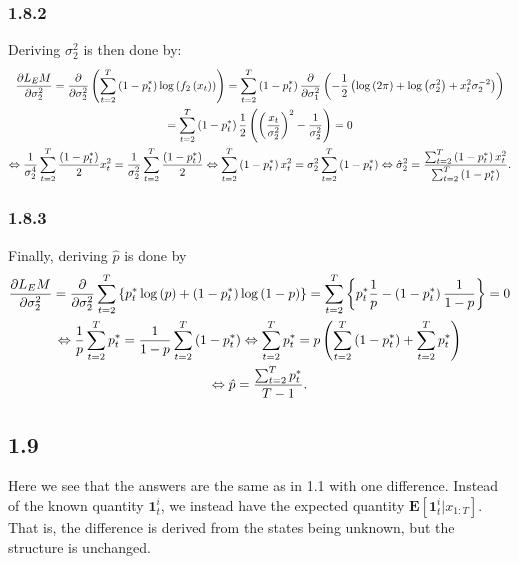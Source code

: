 \documentclass[11pt,a4paper,oneside]{article}
\newcommand{\LL}{\Leftrightarrow}
\newcommand{\lp}{\left(}
\newcommand{\rp}{\right)}
\newcommand{\rb}{\right]}
\newcommand{\lb}{\left[}
\newcommand{\lc}{\left\{}
\newcommand{\rc}{\right\}}
\newcommand{\ee}{\mathbf{E}}
\newcommand{\ii}{\mathbf{1}}
\begin{document}
\subsubsection{1.8.2}
Deriving $\sigma_2^2$ is then done by:
\begin{gather}
    \frac{\partial L_EM}{\partial \sigma_2^2} 
        = \frac{\partial }{\partial \sigma_2^2} \lp \sum_{t=2}^T \lp 1 - p_t^*\rp \log\lp f_2\lp x_t\rp \rp\rp 
        = \sum_{t=2}^T \lp 1 - p_t^*\rp \frac{\partial}{\partial \sigma_1^2} \lp - \frac{1}{2}\lp \log\lp 2 \pi\rp + \log\lp \sigma_2^2\rp + x_t^2 \sigma_2^{-2}\rp\rp  \notag \\
        = \sum_{t=2}^T \lp 1 - p_t^*\rp \frac{1}{2}\lp \lp \frac{x_t}{\sigma_2^2}\rp^2 - \frac{1}{\sigma_2^2}\rp = 0 \notag \\
        \LL \frac{1}{\sigma_2^4}\sum_{t=2}^T \frac{\lp 1 - p_t^*\rp}{2} x_t^2 = \frac{1}{\sigma_2^2}\sum_{t=2}^T\frac{\lp 1 - p_t^*\rp}{2} \LL \sum_{t=2}^T \lp 1 - p_t^*\rp x_t^2 = \sigma_2^2 \sum_{t=2}^T \lp 1 - p_t^*\rp \LL 
        \hat \sigma_2^2 = \frac{\sum_{t=2}^T \lp 1 - p_t^*\rp x_t^2}{\sum_{t=2}^T \lp 1 - p_t^*\rp}.
\end{gather}

\subsubsection{1.8.3}
Finally, deriving $\hat p$ is done by
\begin{gather}
    \frac{\partial L_EM}{\partial \sigma_2^2} 
        = \frac{\partial }{\partial \sigma_2^2} \sum_{t=2}^T \lc p_t^* \log\lp p\rp + \lp 1 - p_t^*\rp \log\lp 1 - p\rp \rc
        = \sum_{t=2}^T \lc p_t^* \frac{1}{p} - \lp 1 - p_t^*\rp \frac{1}{1 - p}\rc = 0 \notag\\
        \LL \frac{1}{p}\sum_{t=2}^T p_t^* = \frac{1}{1-p}\sum_{t=2}^T \lp 1 - p_t^*\rp \LL \sum_{t=2}^T p_t^* = p \lp \sum_{t=2}^T \lp 1 - p_t^*\rp + \sum_{t=2}^T p_t^*\rp \notag \\
        \LL \hat p = \frac{\sum_{t=2}^Tp_t^*}{T-1}.
\end{gather}

\subsection{1.9}
Here we see that the answers are the same as in 1.1 with one difference. Instead of the known quantity $\ii_t^i$, we instead have the expected quantity $\ee\lb \ii_t^i \vert x_{1:T}\rb$. That is, the difference is derived from the states being unknown, but the structure is unchanged.
\end{document}
